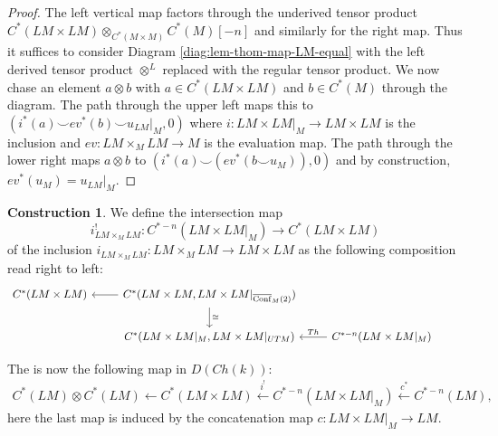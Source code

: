 \documentclass{scrartcl}
\let\emph\relax
\theoremstyle{plain}
\theoremstyle{definition}
\newtheorem{construction}[theorem]{Construction}
\newcommand{\cupp}{\mathbin{\smile}}
\newcommand{\iso}{\cong}
\newcommand{\from}{\leftarrow}
\let\xfrom\xleftarrow
\DeclareMathOperator{\cConf}{\overline{Conf}}
\begin{document}
\begin{enumerate}[(1)]
\begin{proof}
    The left vertical map factors through the underived tensor product $C^*(LM\times LM)\otimes_{C^*(M\times M)} C^*(M)[-n]$ and similarly for the right map. Thus it suffices to consider Diagram \ref{diag:lem-thom-map-LM-equal} with the left derived tensor product $\otimes^L$ replaced with the regular tensor product. We now chase an element $a\otimes b$ with $a\in C^*(LM\times LM)$ and $b\in C^*(M)$ through the diagram. The path through the upper left maps this to $(i^*(a)\cupp ev^*(b)\cupp u_{LM}|_M, 0)$ where $i\colon LM\times LM|_M\to LM\times LM$ is the inclusion and $ev\colon LM\times_M LM\to M$ is the evaluation map. The path through the lower right maps $a\otimes b$ to $(i^*(a)\cupp(ev^*(b\cupp u_{M})) ,0)$ and by construction, $ev^*(u_M) = u_{LM}|_M$.
\end{proof}
\end{enumerate}

\begin{construction}\label{constr:loop-intersection-via-configuration}
    We define the intersection map $$i_{LM\times_M LM}^!\colon C^{*-n}(LM\times LM|_M) \to C^{*}(LM \times LM)$$ of the inclusion $i_{LM\times_M LM}\colon LM\times_M LM\to LM\times LM$ as the following composition read right to left:
\begin{equation}\label{diag:constr-loop-intersection-via-configuration}
    \begin{tikzcd}
        C^{*}(LM \times LM) & \lar C^*(LM\times LM, LM\times LM|_{\cConf_M(2)}) \dar["\iso"] & &\\
        & C^*(LM\times LM|_{M}, LM\times LM|_{UTM}) & \lar[swap, "Th"] C^{*-n}(LM\times LM|_M)
    \end{tikzcd}
\end{equation}
\end{construction}

The \emph{loop product} is now the following map in $D(Ch(k))$: 
\begin{align*}
    C^*(LM)\otimes C^*(LM) \from C^*(LM\times LM) \xfrom{i^!} C^{*-n}(LM\times LM|_M) \xfrom{c^*} C^{*-n}(LM),
\end{align*}
here the last map is induced by the concatenation map $c\colon LM\times LM|_M \to LM$.
\end{document}

